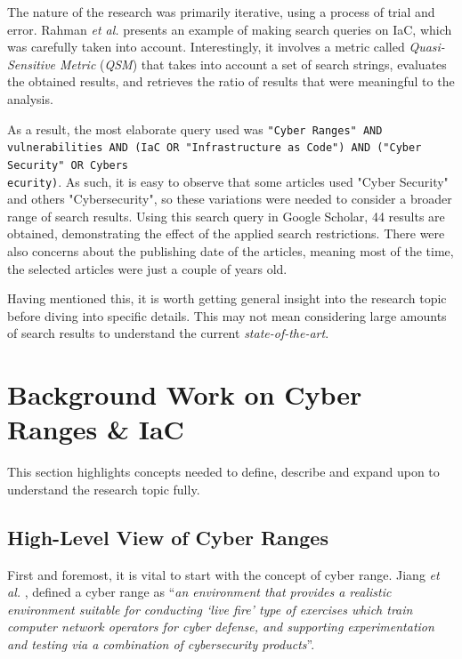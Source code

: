 The nature of the research was primarily iterative, using a process of trial and error. Rahman \textit{et al.} \cite{systematic_mapping_ref} presents an example of making search queries on IaC, which was carefully taken into account. Interestingly, it involves a metric called \textit{Quasi-Sensitive Metric} (\textit{QSM}) that takes into account a set of search strings, evaluates the obtained results, and retrieves the ratio of results that were meaningful to the analysis. 

As a result, the most elaborate query used was \texttt{"Cyber Ranges" AND vulnerabilities AND (IaC OR "Infrastructure as Code") AND ("Cyber Security" OR Cybers}\\ \texttt{ecurity)}. As such, it is easy to observe that some articles used "Cyber Security" and others "Cybersecurity", so these variations were needed to consider a broader range of search results. Using this search query in Google Scholar, 44 results are obtained, demonstrating the effect of the applied search restrictions. There were also concerns about the publishing date of the articles, meaning most of the time, the selected articles were just a couple of years old. 

Having mentioned this, it is worth getting general insight into the research topic before diving into specific details. This may not mean considering large amounts of search results to understand the current \textit{state-of-the-art}.

\section{Background Work on Cyber Ranges \& IaC} \label{sec:background}

This section highlights concepts needed to define, describe and expand upon to understand the research topic fully.

\subsection{High-Level View of Cyber Ranges} \label{sec:high_level_cr_explanation}

First and foremost, it is vital to start with the concept of cyber range. Jiang \textit{et al.} \cite{pandora_ref}, defined a cyber range as ``\textit{an environment that provides a realistic environment suitable for conducting `live fire' type of exercises which train computer network operators for cyber defense, and supporting experimentation and testing via a combination of cybersecurity products}''.

